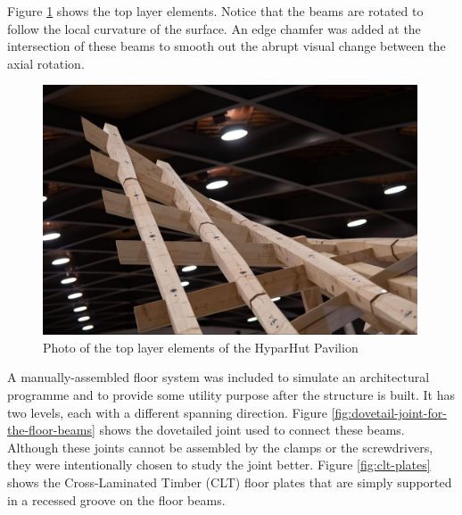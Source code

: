 Figure \ref{fig:top-layer-elements-photo} shows the top layer elements. Notice that the beams are rotated to follow the local curvature of the surface. An edge chamfer was added at the intersection of these beams to smooth out the abrupt visual change between the axial rotation.

\begin{figure}[!h]
    \centering
    \includegraphics[width=0.99\textwidth]{images/7b/img05.jpg}
    \caption{Photo of the top layer elements of the HyparHut Pavilion}
    \label{fig:top-layer-elements-photo}
\end{figure}


A manually-assembled floor system was included to simulate an architectural programme and to provide some utility purpose after the structure is built. It has two levels, each with a different spanning direction. Figure \ref{fig:dovetail-joint-for-the-floor-beams} shows the dovetailed joint used to connect these beams. Although these joints cannot be assembled by the clamps or the screwdrivers, they were intentionally chosen to study the joint better. Figure \ref{fig:clt-plates} shows the Cross-Laminated Timber (CLT) floor plates that are simply supported in a recessed groove on the floor beams.

